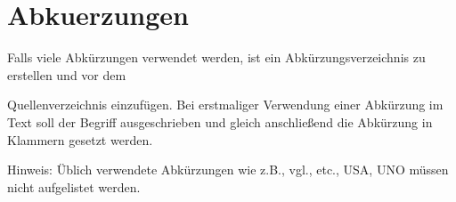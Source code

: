 \part{Abkuerzungen}
Falls viele Abkürzungen verwendet werden, ist ein Abkürzungsverzeichnis zu erstellen und vor dem 

Quellenverzeichnis einzufügen. Bei erstmaliger Verwendung einer Abkürzung im Text soll der Begriff ausgeschrieben und 
gleich anschließend die Abkürzung in Klammern gesetzt werden. 

Hinweis: 
Üblich verwendete Abkürzungen wie z.B., vgl., etc., USA, UNO müssen nicht aufgelistet werden.